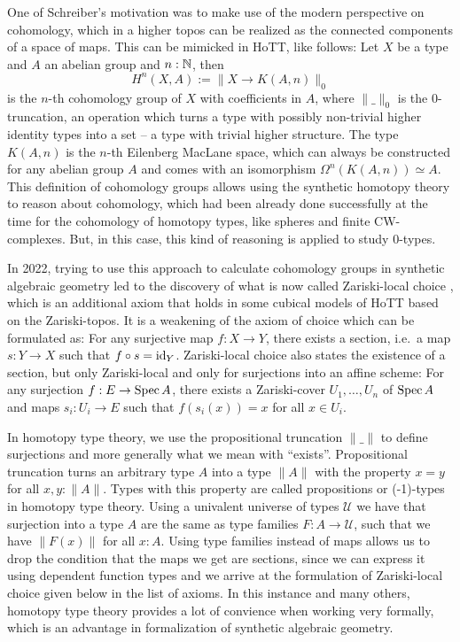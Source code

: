 One of Schreiber's motivation was to make use of the modern perspective on cohomology, which in a higher topos can be realized as the connected components of a space of maps. This can be mimicked in HoTT, like follows: Let $X$ be a type and $A$ an abelian group and $n:\mathbb{N}$, then
\[ H^n(X,A):=\| X\to K(A,n) \|_0\]
is the $n$-th cohomology group of $X$ with coefficients in $A$, where $\|\_\|_0$ is the $0$-truncation, an operation which turns a type with possibly non-trivial higher identity types into a set -- a type with trivial higher structure. The type $K(A,n)$ is the $n$-th Eilenberg MacLane space, which can always be constructed for any abelian group $A$ and comes with an isomorphism $\Omega^n(K(A,n))\simeq A$.
This definition of cohomology groups allows using the synthetic homotopy theory to reason about cohomology, which had been already done successfully at the time for the cohomology of homotopy types, like spheres and finite CW-complexes. But, in this case, this kind of reasoning is applied to study $0$-types.

In 2022, trying to use this approach to calculate cohomology groups in synthetic algebraic geometry led to the discovery of what is now called Zariski-local choice \cite{draft},
which is an additional axiom that holds in some cubical models of HoTT based on the Zariski-topos.
It is a weakening of the axiom of choice which can be formulated as: For any surjective map $f:X\to Y$, there exists a section, i.e.\ a map $s:Y\to X$ such that $f\circ s=\mathrm{id}_Y$.
Zariski-local choice also states the existence of a section, but only Zariski-local and only for surjections into an affine scheme: For any surjection $f:E\to \operatorname{Spec} A$,
there exists a Zariski-cover $U_1,\dots,U_n$ of $\operatorname{Spec} A$ and maps $s_i:U_i\to E$ such that $f(s_i(x))=x$ for all $x\in U_i$.

In homotopy type theory, we use the propositional truncation $\|\_\|$ to define surjections and more generally what we mean with ``exists''.
Propositional truncation turns an arbitrary type $A$ into a type $\|A\|$ with the property $x=y$ for all $x,y:\|A\|$.
Types with this property are called propositions or (-1)-types in homotopy type theory.
Using a univalent universe of types $\mathcal U$ we have that surjection into a type $A$ are the same as type families $F:A\to \mathcal U$, such that we have $\|F(x)\|$ for all $x: A$.
Using type families instead of maps allows us to drop the condition that the maps we get are sections, since we can express it using dependent function types and we arrive at the formulation of Zariski-local choice given below in the list of axioms.
In this instance and many others, homotopy type theory provides a lot of convience when working very formally, which is an advantage in formalization of synthetic algebraic geometry.

